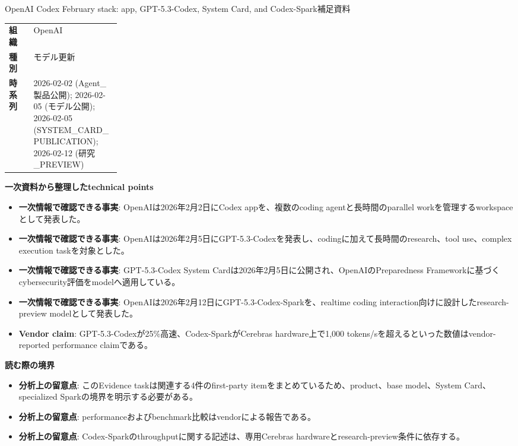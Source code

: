 \begin{technicalnote}{OpenAI Codex February stack: app, GPT-5.3-Codex, System Card, and Codex-Spark}{補足資料}
\begingroup
\begin{tabularx}{\linewidth}{@{}>{\bfseries}p{0.22\linewidth}X@{}}
組織 & OpenAI \\
種別 & モデル更新 \\
時系列 & 2026-02-02 (Agent\_製品公開); 2026-02-05 (モデル公開); 2026-02-05 (SYSTEM\_CARD\_PUBLICATION); 2026-02-12 (研究\_PREVIEW) \\
\end{tabularx}
\smallskip
{\bfseries 一次資料から整理したtechnical points}
\begin{itemize}[leftmargin=1.5em,itemsep=0.35em]
\item \textbf{一次情報で確認できる事実}: OpenAIは2026年2月2日にCodex appを、複数のcoding agentと長時間のparallel workを管理するworkspaceとして発表した。
\item \textbf{一次情報で確認できる事実}: OpenAIは2026年2月5日にGPT-5.3-Codexを発表し、codingに加えて長時間のresearch、tool use、complex execution taskを対象とした。
\item \textbf{一次情報で確認できる事実}: GPT-5.3-Codex System Cardは2026年2月5日に公開され、OpenAIのPreparedness Frameworkに基づくcybersecurity評価をmodelへ適用している。
\item \textbf{一次情報で確認できる事実}: OpenAIは2026年2月12日にGPT-5.3-Codex-Sparkを、realtime coding interaction向けに設計したresearch-preview modelとして発表した。
\item \textbf{Vendor claim}: GPT-5.3-Codexが25\%高速、Codex-SparkがCerebras hardware上で1,000 tokens/sを超えるといった数値はvendor-reported performance claimである。
\end{itemize}
\begin{minipage}{\linewidth}
{\bfseries 読む際の境界}
\begin{itemize}[leftmargin=1.5em,itemsep=0.35em]
\item \textbf{分析上の留意点}: このEvidence taskは関連する4件のfirst-party itemをまとめているため、product、base model、System Card、specialized Sparkの境界を明示する必要がある。
\item \textbf{分析上の留意点}: performanceおよびbenchmark比較はvendorによる報告である。
\item \textbf{分析上の留意点}: Codex-Sparkのthroughputに関する記述は、専用Cerebras hardwareとresearch-preview条件に依存する。

\end{itemize}
\end{minipage}
\end{technicalnote}

